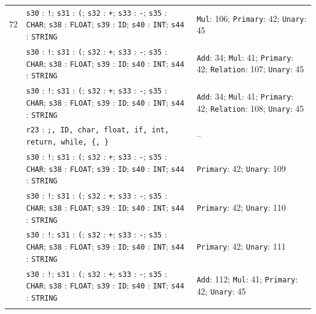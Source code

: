 {\begin{longtable}{@{}r p{10.1cm}p{4.4cm}@{}}
72 & \texttt{s30} : \texttt{!}; \texttt{s31} : \texttt{(}; \texttt{s32} : \texttt{+}; \texttt{s33} : \texttt{-}; \texttt{s35} : \texttt{CHAR}; \texttt{s38} : \texttt{FLOAT}; \texttt{s39} : \texttt{ID}; \texttt{s40} : \texttt{INT}; \texttt{s44} : \texttt{STRING} & \texttt{Mul}: 106; \texttt{Primary}: 42; \texttt{Unary}: 45\\\addlinespace[3pt]
73 & \texttt{s30} : \texttt{!}; \texttt{s31} : \texttt{(}; \texttt{s32} : \texttt{+}; \texttt{s33} : \texttt{-}; \texttt{s35} : \texttt{CHAR}; \texttt{s38} : \texttt{FLOAT}; \texttt{s39} : \texttt{ID}; \texttt{s40} : \texttt{INT}; \texttt{s44} : \texttt{STRING} & \texttt{Add}: 34; \texttt{Mul}: 41; \texttt{Primary}: 42; \texttt{Relation}: 107; \texttt{Unary}: 45\\\addlinespace[3pt]
74 & \texttt{s30} : \texttt{!}; \texttt{s31} : \texttt{(}; \texttt{s32} : \texttt{+}; \texttt{s33} : \texttt{-}; \texttt{s35} : \texttt{CHAR}; \texttt{s38} : \texttt{FLOAT}; \texttt{s39} : \texttt{ID}; \texttt{s40} : \texttt{INT}; \texttt{s44} : \texttt{STRING} & \texttt{Add}: 34; \texttt{Mul}: 41; \texttt{Primary}: 42; \texttt{Relation}: 108; \texttt{Unary}: 45\\\addlinespace[3pt]
75 & \texttt{r23} : \texttt{;, ID, char, float, if, int, return, while, \{, \}} & --\\\addlinespace[3pt]
76 & \texttt{s30} : \texttt{!}; \texttt{s31} : \texttt{(}; \texttt{s32} : \texttt{+}; \texttt{s33} : \texttt{-}; \texttt{s35} : \texttt{CHAR}; \texttt{s38} : \texttt{FLOAT}; \texttt{s39} : \texttt{ID}; \texttt{s40} : \texttt{INT}; \texttt{s44} : \texttt{STRING} & \texttt{Primary}: 42; \texttt{Unary}: 109\\\addlinespace[3pt]
77 & \texttt{s30} : \texttt{!}; \texttt{s31} : \texttt{(}; \texttt{s32} : \texttt{+}; \texttt{s33} : \texttt{-}; \texttt{s35} : \texttt{CHAR}; \texttt{s38} : \texttt{FLOAT}; \texttt{s39} : \texttt{ID}; \texttt{s40} : \texttt{INT}; \texttt{s44} : \texttt{STRING} & \texttt{Primary}: 42; \texttt{Unary}: 110\\\addlinespace[3pt]
78 & \texttt{s30} : \texttt{!}; \texttt{s31} : \texttt{(}; \texttt{s32} : \texttt{+}; \texttt{s33} : \texttt{-}; \texttt{s35} : \texttt{CHAR}; \texttt{s38} : \texttt{FLOAT}; \texttt{s39} : \texttt{ID}; \texttt{s40} : \texttt{INT}; \texttt{s44} : \texttt{STRING} & \texttt{Primary}: 42; \texttt{Unary}: 111\\\addlinespace[3pt]
79 & \texttt{s30} : \texttt{!}; \texttt{s31} : \texttt{(}; \texttt{s32} : \texttt{+}; \texttt{s33} : \texttt{-}; \texttt{s35} : \texttt{CHAR}; \texttt{s38} : \texttt{FLOAT}; \texttt{s39} : \texttt{ID}; \texttt{s40} : \texttt{INT}; \texttt{s44} : \texttt{STRING} & \texttt{Add}: 112; \texttt{Mul}: 41; \texttt{Primary}: 42; \texttt{Unary}: 45\\\addlinespace[3pt]

\end{longtable}}
